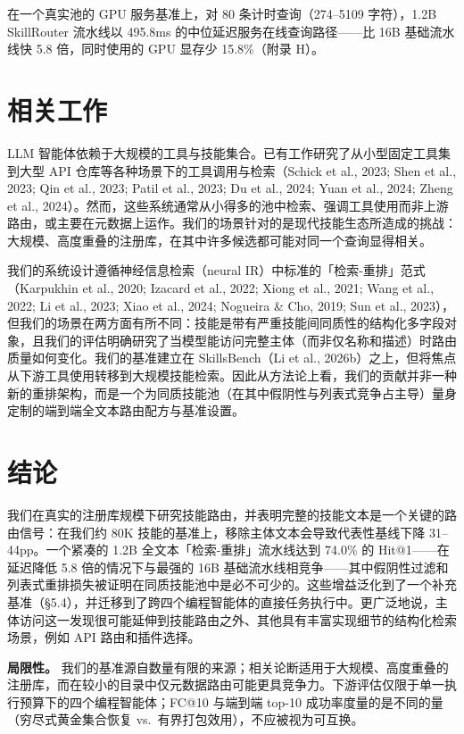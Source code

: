 \documentclass[11pt,UTF8,fontset=fandol]{ctexart}
\makeatletter
\newcommand{\Hit}{Hit@1}
\makeatother
\begin{document}
在一个真实池的 GPU 服务基准上，对 80 条计时查询（274--5109 字符），1.2B SkillRouter 流水线以 495.8ms 的中位延迟服务在线查询路径——比 16B 基础流水线快 5.8 倍，同时使用的 GPU 显存少 15.8\%（附录 H）。

\section{相关工作}

LLM 智能体依赖于大规模的工具与技能集合。已有工作研究了从小型固定工具集到大型 API 仓库等各种场景下的工具调用与检索（Schick et al., 2023; Shen et al., 2023; Qin et al., 2023; Patil et al., 2023; Du et al., 2024; Yuan et al., 2024; Zheng et al., 2024）。然而，这些系统通常从小得多的池中检索、强调工具使用而非上游路由，或主要在元数据上运作。我们的场景针对的是现代技能生态所造成的挑战：大规模、高度重叠的注册库，在其中许多候选都可能对同一个查询显得相关。

我们的系统设计遵循神经信息检索（neural IR）中标准的「检索-重排」范式（Karpukhin et al., 2020; Izacard et al., 2022; Xiong et al., 2021; Wang et al., 2022; Li et al., 2023; Xiao et al., 2024; Nogueira \& Cho, 2019; Sun et al., 2023），但我们的场景在两方面有所不同：技能是带有严重技能间同质性的结构化多字段对象，且我们的评估明确研究了当模型能访问完整主体（而非仅名称和描述）时路由质量如何变化。我们的基准建立在 SkillsBench（Li et al., 2026b）之上，但将焦点从下游工具使用转移到大规模技能检索。因此从方法论上看，我们的贡献并非一种新的重排架构，而是一个为同质技能池（在其中假阴性与列表式竞争占主导）量身定制的端到端全文本路由配方与基准设置。

\section{结论}

我们在真实的注册库规模下研究技能路由，并表明完整的技能文本是一个关键的路由信号：在我们约 80K 技能的基准上，移除主体文本会导致代表性基线下降 31--44pp。一个紧凑的 1.2B 全文本「检索-重排」流水线达到 74.0\% 的 \Hit{}——在延迟降低 5.8 倍的情况下与最强的 16B 基础流水线相竞争——其中假阴性过滤和列表式重排损失被证明在同质技能池中是必不可少的。这些增益泛化到了一个补充基准（\S5.4），并迁移到了跨四个编程智能体的直接任务执行中。更广泛地说，主体访问这一发现很可能延伸到技能路由之外、其他具有丰富实现细节的结构化检索场景，例如 API 路由和插件选择。

\textbf{局限性。} 我们的基准源自数量有限的来源；相关论断适用于大规模、高度重叠的注册库，而在较小的目录中仅元数据路由可能更具竞争力。下游评估仅限于单一执行预算下的四个编程智能体；FC@10 与端到端 top-10 成功率度量的是不同的量（穷尽式黄金集合恢复 vs.\ 有界打包效用），不应被视为可互换。
\end{document}
